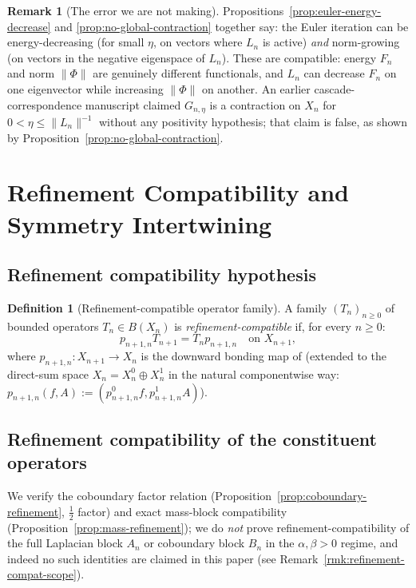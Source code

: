 \documentclass[11pt, a4paper]{amsart}
\theoremstyle{definition}
\newtheorem{definition}[theorem]{Definition}
\newtheorem{remark}[theorem]{Remark}
\begin{document}
\begin{remark}[The error we are not making]
\label{rmk:no-global-contraction-error}
Propositions~\ref{prop:euler-energy-decrease} and
\ref{prop:no-global-contraction} together say: the Euler iteration
can be energy-decreasing (for small $\eta$, on vectors where $L_n$
is active) \emph{and} norm-growing (on vectors in the negative
eigenspace of $L_n$). These are compatible: energy $F_n$ and norm
$\|\Phi\|$ are genuinely different functionals, and $L_n$ can
decrease $F_n$ on one eigenvector while increasing $\|\Phi\|$ on
another. An earlier cascade-correspondence manuscript claimed
$G_{n, \eta}$ is a contraction on $X_n$ for $0 < \eta \leq
\|L_n\|^{-1}$ without any positivity hypothesis; that claim is
false, as shown by Proposition~\ref{prop:no-global-contraction}.
\end{remark}

\section{Refinement Compatibility and Symmetry Intertwining}
\label{sec:refinement-compat}

\subsection{Refinement compatibility hypothesis}

\begin{definition}[Refinement-compatible operator family]
\label{def:refinement-compat}
A family $(T_n)_{n \geq 0}$ of bounded operators $T_n \in B(X_n)$
is \emph{refinement-compatible} if, for every $n \geq 0$:
\[
  p_{n+1, n} T_{n+1} = T_n p_{n+1, n} \quad \text{on } X_{n+1},
\]
where $p_{n+1, n} \colon X_{n+1} \to X_n$ is the downward bonding
map of \cite[Theorem~\texttt{thm:bonding}]{RefinementSpaces} (extended to the
direct-sum space $X_n = X_n^0 \oplus X_n^1$ in the natural
componentwise way: $p_{n+1, n}(f, A) := (p_{n+1, n}^0 f, p_{n+1, n}
^1 A)$).
\end{definition}

\subsection{Refinement compatibility of the constituent operators}

We verify the coboundary factor relation (Proposition~\ref{prop:coboundary-refinement}, $\tfrac{1}{2}$ factor) and exact mass-block compatibility (Proposition~\ref{prop:mass-refinement}); we do \emph{not} prove refinement-compatibility of the full Laplacian block $A_n$ or coboundary block $B_n$ in the $\alpha,\beta>0$ regime, and indeed no such identities are claimed in this paper (see Remark~\ref{rmk:refinement-compat-scope}).
\end{document}
